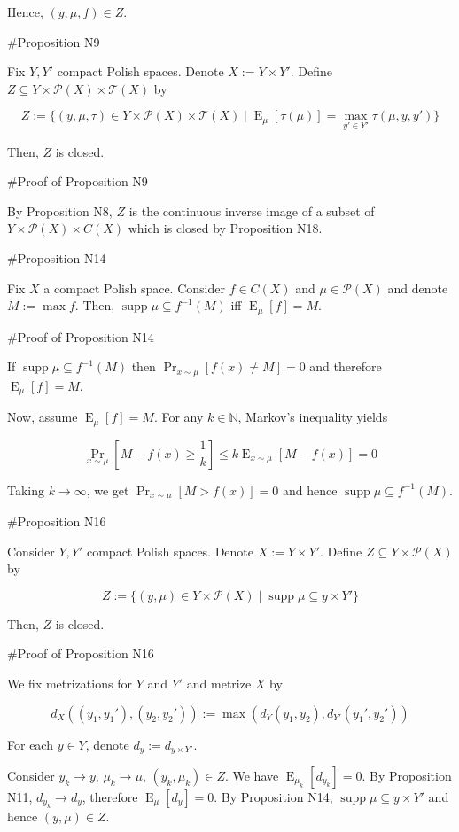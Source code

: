 \documentclass[a4paper]{article}
\DeclareMathOperator{\Supp}{supp}
\DeclareMathOperator{\Prb}{Pr}
\DeclareMathOperator{\E}{E}
\newcommand{\Nats}{\mathbb{N}}
\newcommand{\Prob}{\mathcal{P}}
\newcommand{\T}{\mathcal{T}}
\begin{document}
Hence, ${(y,\mu,f) \in Z}$.

\#Proposition N9

Fix ${Y,Y'}$ compact Polish spaces. Denote ${X:=Y \times Y'}$. Define ${Z \subseteq Y \times \Prob(X) \times \T(X)}$ by

$$Z:=\{(y,\mu,\tau) \in Y \times \Prob(X) \times \T(X) \mid \E_\mu[\tau(\mu)] = \max_{y' \in Y'} \tau(\mu,y,y')\}$$

Then, ${Z}$ is closed.

\#Proof of Proposition N9

By Proposition N8, ${Z}$ is the continuous inverse image of a subset of ${Y \times \Prob(X) \times C(X)}$ which is closed by Proposition N18.

\#Proposition N14

Fix ${X}$ a compact Polish space. Consider ${f \in C(X)}$ and ${\mu \in \Prob(X)}$ and denote ${M := \max f}$. Then, ${\Supp \mu \subseteq f^{-1}(M)}$ iff ${\E_\mu[f] = M}$.

\#Proof of Proposition N14

If ${\Supp \mu \subseteq f^{-1}(M)}$ then $\Prb_{x\sim \mu}[f(x) \ne M] = 0$ and therefore ${\E_\mu[f] = M}$.

Now, assume ${\E_\mu[f] = M}$. For any ${k \in \Nats}$, Markov's inequality yields 

$$\Prb_{x\sim \mu}[M - f(x) \geq \frac{1}{k}] \leq k\E_{x \sim \mu}[M - f(x)] = 0$$

Taking $k \rightarrow \infty$, we get ${\Prb_{x\sim \mu}[M > f(x)] = 0}$ and hence ${\Supp \mu \subseteq f^{-1}(M)}$.

\#Proposition N16

Consider ${Y,Y'}$ compact Polish spaces. Denote ${X:=Y \times Y'}$. Define ${Z \subseteq Y \times \Prob(X)}$ by

$$Z:=\{(y,\mu) \in Y \times \Prob(X) \mid \Supp \mu \subseteq y \times Y'\}$$

Then, ${Z}$ is closed.

\#Proof of Proposition N16

We fix metrizations for ${Y}$ and ${Y'}$ and metrize ${X}$ by 

$${d_X((y_1,y_1'),(y_2,y_2')):=\max(d_Y(y_1,y_2),d_{Y'}(y_1',y_2'))}$$

For each ${y \in Y}$, denote ${d_{y}:=d_{y \times Y'}}$.

Consider ${y_k \rightarrow y}$, ${\mu_k \rightarrow \mu}$, ${(y_k, \mu_k) \in Z}$. We have ${\E_{\mu_k}[d_{y_k}]=0}$. By Proposition N11, ${d_{y_k} \rightarrow d_y}$, therefore ${\E_\mu[d_y] = 0}$. By Proposition N14, ${\Supp \mu \subseteq y \times Y'}$ and hence ${(y,\mu) \in Z}$.
\end{document}
